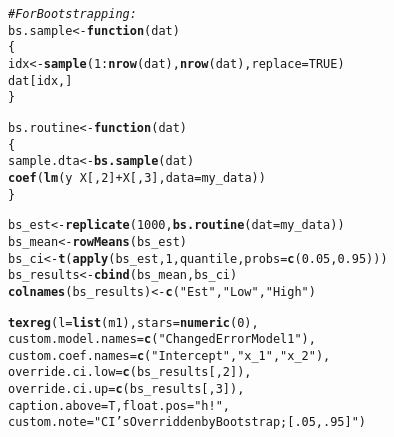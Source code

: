 \documentclass[12pt]{article}\usepackage[]{graphicx}\usepackage[]{color}
\makeatletter
\newcommand{\hlnum}[1]{\textcolor[rgb]{0.686,0.059,0.569}{#1}}%
\newcommand{\hlstr}[1]{\textcolor[rgb]{0.192,0.494,0.8}{#1}}%
\newcommand{\hlcom}[1]{\textcolor[rgb]{0.678,0.584,0.686}{\textit{#1}}}%
\newcommand{\hlopt}[1]{\textcolor[rgb]{0,0,0}{#1}}%
\newcommand{\hlstd}[1]{\textcolor[rgb]{0.345,0.345,0.345}{#1}}%
\newcommand{\hlkwa}[1]{\textcolor[rgb]{0.161,0.373,0.58}{\textbf{#1}}}%
\newcommand{\hlkwb}[1]{\textcolor[rgb]{0.69,0.353,0.396}{#1}}%
\newcommand{\hlkwc}[1]{\textcolor[rgb]{0.333,0.667,0.333}{#1}}%
\newcommand{\hlkwd}[1]{\textcolor[rgb]{0.737,0.353,0.396}{\textbf{#1}}}%
\newenvironment{kframe}{%
 \def\at@end@of@kframe{}%
 \ifinner\ifhmode%
  \def\at@end@of@kframe{\end{minipage}}%
  \begin{minipage}{\columnwidth}%
 \fi\fi%
 \def\FrameCommand##1{\hskip\@totalleftmargin \hskip-\fboxsep
 \colorbox{shadecolor}{##1}\hskip-\fboxsep
     \hskip-\linewidth \hskip-\@totalleftmargin \hskip\columnwidth}%
 \MakeFramed {\advance\hsize-\width
   \@totalleftmargin\z@ \linewidth\hsize
   \@setminipage}}%
 {\par\unskip\endMakeFramed%
 \at@end@of@kframe}
\newenvironment{knitrout}{}{} %
\makeatother
\begin{document}
\begin{flushleft}
\begin{knitrout}
\begin{kframe}
\begin{alltt}
\hlcom{#For Bootstrapping:}
\hlstd{bs.sample} \hlkwb{<-} \hlkwa{function}\hlstd{(}\hlkwc{dat}\hlstd{)}
\hlstd{\{}
  \hlstd{idx} \hlkwb{<-} \hlkwd{sample}\hlstd{(}\hlnum{1}\hlopt{:}\hlkwd{nrow}\hlstd{(dat),} \hlkwd{nrow}\hlstd{(dat),} \hlkwc{replace} \hlstd{=} \hlnum{TRUE}\hlstd{)}
  \hlstd{dat[idx,]}
\hlstd{\}}

\hlstd{bs.routine} \hlkwb{<-} \hlkwa{function}\hlstd{(}\hlkwc{dat}\hlstd{)}
\hlstd{\{}
  \hlstd{sample.dta} \hlkwb{<-} \hlkwd{bs.sample}\hlstd{(dat)}
  \hlkwd{coef}\hlstd{(}\hlkwd{lm}\hlstd{(y} \hlopt{~} \hlstd{X[,}\hlnum{2}\hlstd{]} \hlopt{+} \hlstd{X[,}\hlnum{3}\hlstd{],} \hlkwc{data} \hlstd{= my_data))}
\hlstd{\}}

\hlstd{bs_est} \hlkwb{<-} \hlkwd{replicate}\hlstd{(}\hlnum{1000}\hlstd{,} \hlkwd{bs.routine}\hlstd{(}\hlkwc{dat} \hlstd{= my_data))}
\hlstd{bs_mean} \hlkwb{<-} \hlkwd{rowMeans}\hlstd{(bs_est)}
\hlstd{bs_ci} \hlkwb{<-} \hlkwd{t}\hlstd{(}\hlkwd{apply}\hlstd{(bs_est,} \hlnum{1}\hlstd{, quantile,} \hlkwc{probs} \hlstd{=} \hlkwd{c}\hlstd{(}\hlnum{0.05}\hlstd{,} \hlnum{0.95}\hlstd{)))}
\hlstd{bs_results} \hlkwb{<-} \hlkwd{cbind}\hlstd{(bs_mean, bs_ci)}
\hlkwd{colnames}\hlstd{(bs_results)} \hlkwb{<-} \hlkwd{c}\hlstd{(}\hlstr{"Est"}\hlstd{,} \hlstr{"Low"}\hlstd{,} \hlstr{"High"}\hlstd{)}

\hlkwd{texreg}\hlstd{(}\hlkwc{l}\hlstd{=} \hlkwd{list}\hlstd{(m1),} \hlkwc{stars} \hlstd{=} \hlkwd{numeric}\hlstd{(}\hlnum{0}\hlstd{),}
       \hlkwc{custom.model.names} \hlstd{=} \hlkwd{c}\hlstd{(}\hlstr{"Changed Error Model 1"}\hlstd{),}
       \hlkwc{custom.coef.names} \hlstd{=} \hlkwd{c}\hlstd{(}\hlstr{"Intercept"}\hlstd{,} \hlstr{"x_1"}\hlstd{,} \hlstr{"x_2"}\hlstd{),}
       \hlkwc{override.ci.low} \hlstd{=} \hlkwd{c}\hlstd{(bs_results[,} \hlnum{2}\hlstd{]),}
       \hlkwc{override.ci.up} \hlstd{=} \hlkwd{c}\hlstd{(bs_results[,} \hlnum{3}\hlstd{]),}
       \hlkwc{caption.above} \hlstd{= T,} \hlkwc{float.pos} \hlstd{=} \hlstr{"h!"}\hlstd{,}
       \hlkwc{custom.note} \hlstd{=} \hlstr{"CI's Overridden by Bootstrap; [.05, .95]"}\hlstd{)}
\end{alltt}
\end{kframe}
\end{knitrout}


\end{flushleft}
\end{document}
